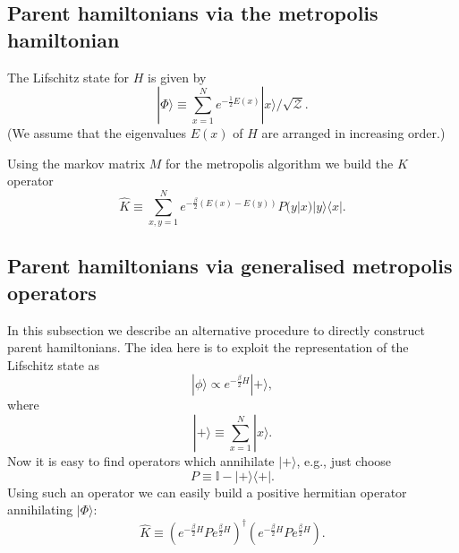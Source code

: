 \documentclass[twocolumn,lengthcheck,superscriptaddress]{revtex4-1}
\theoremstyle{definition}
\theoremstyle{remark}
\begin{document}
\subsection{Parent hamiltonians via the metropolis hamiltonian}
The Lifschitz state for $H$ is given by
\begin{equation}
	|\Phi\rangle \equiv \sum_{x=1}^N e^{-\frac12E(x)}|x\rangle/\sqrt{\mathcal{Z}}.
\end{equation}
(We assume that the eigenvalues $E(x)$ of $H$ are arranged in increasing order.)

Using the markov matrix $M$ for the metropolis algorithm we build the $K$ operator
\begin{equation}
	\widehat{K} \equiv \sum_{x,y=1}^N e^{-\frac{\beta}{2}(E(x)-E(y))} P(y|x) |y\rangle\langle x|.
\end{equation}


\subsection{Parent hamiltonians via generalised metropolis operators}
In this subsection we describe an alternative procedure to directly construct parent hamiltonians. The idea here is to exploit the representation of the Lifschitz state as
\begin{equation}
	|\phi\rangle \propto e^{-\frac{\beta}{2} H}|+\rangle,
\end{equation}
where
\begin{equation}
	|+\rangle \equiv \sum_{x=1}^N |x\rangle.
\end{equation}
Now it is easy to find operators which annihilate $|+\rangle$, e.g., just choose
\begin{equation}
	P \equiv \mathbb{I} - |+\rangle\langle+|.
\end{equation}
Using such an operator we can easily build a positive hermitian operator annihilating $|\Phi\rangle$:
\begin{equation}
	\widehat{K} \equiv  \left(e^{-\frac{\beta}{2} H} P e^{\frac{\beta}{2} H} \right)^\dag\left(e^{-\frac{\beta}{2} H} P e^{\frac{\beta}{2} H} \right).
\end{equation}
\end{document}
